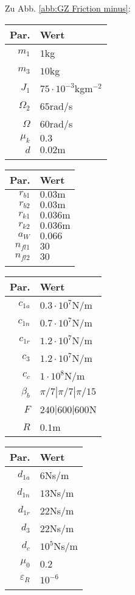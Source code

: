 Zu Abb. \ref{abb:GZ Friction minus}:
\begin{center}
\begin{tabular}{r|l}
Par.&Wert\\\hline
$m_1$&$1$kg\\
$m_3$&$10$kg\\
$J_1$&$75\cdot10^{-3}$kgm$^{-2}$\\
$\Omega_2$&$65$rad/s\\
$\Omega$& $60$rad/s\\
$\mu_k$& $0.3$\\
$d $&$ 0.02\textrm{m}$ \\
&
\end{tabular}\hfill
\begin{tabular}{r|l}
Par.&Wert\\\hline
$r_{b1}$&$0.03\textrm{m}$\\
$r_{b2}$&$0.03\textrm{m}$\\
$r_{k1}$&$0.036\textrm{m}$\\
$r_{k2}$&$0.036\textrm{m}$\\
$a_W $&$ 0.066$\\
$n_{fl1}$&$30$\\
$n_{fl2}$&$30$\\
&
\end{tabular}\hfill
\begin{tabular}{r|l}
Par.&Wert\\\hline
$c_{1a}$&$0.3\cdot10^{7}$N/m\\
$c_{1n}$&$0.7\cdot10^{7}$N/m\\
$c_{1r}$&$1.2\cdot10^{7}$N/m\\
$c_{3}$&$1.2\cdot10^{7}$N/m\\
$c_{c}$&$1\cdot10^{8}$N/m\\
$\beta_b$ & $\pi/7|\pi/7|\pi/15$\\
$F$&$240|600|600$N\\
$R$&$0.1$m\\
\end{tabular}\hfill
\begin{tabular}{r|l}
Par.&Wert\\\hline
$d_{1a}$&$6$Ns/m\\
$d_{1n}$&$13$Ns/m\\
$d_{1r}$&$22$Ns/m\\
$d_{3}$&$22$Ns/m\\
$d_{c}$&$10^{5}$Ns/m\\
$\mu_0$&0.2\\
$\varepsilon_R $&$ 10^{-6}$\\
&
\end{tabular}
\end{center}

